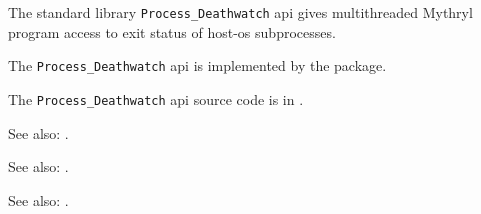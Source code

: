 
The standard library {\tt Process\_Deathwatch} api gives multithreaded Mythryl program access to exit status of host-os subprocesses.

The {\tt Process\_Deathwatch} api is implemented by the  package.

The {\tt Process\_Deathwatch} api source code is in .

See also: .

See also: .

See also: .
